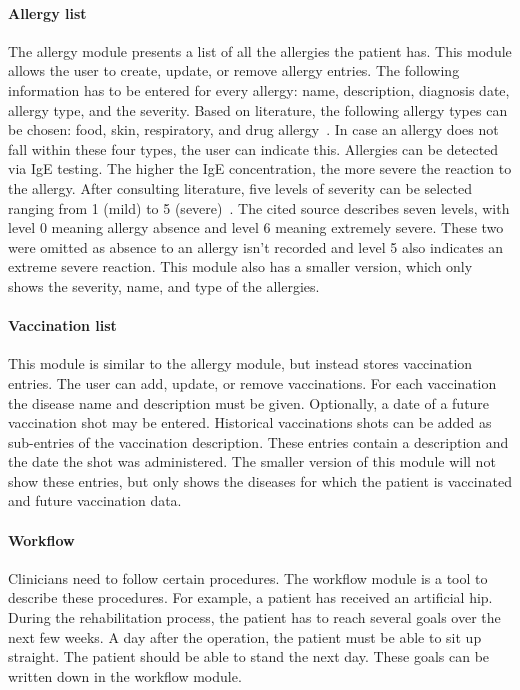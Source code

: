         \paragraph{Allergy list} The allergy module presents a list of all the allergies the patient has. This module allows the user to create, update, or remove allergy entries. The following information has to be entered for every allergy: name, description, diagnosis date, allergy type, and the severity. Based on literature, the following allergy types can be chosen: food, skin, respiratory, and drug allergy~\cite{AllergyTypesACAAI, AllergyTypesHealth24}. In case an allergy does not fall within these four types, the user can indicate this. Allergies can be detected via IgE testing. The higher the IgE concentration, the more severe the reaction to the allergy. After consulting literature, five levels of severity can be selected ranging from 1 (mild) to 5 (severe)~\cite{AllergySeverity}. The cited source describes seven levels, with level 0 meaning allergy absence and level 6 meaning extremely severe. These two were omitted as absence to an allergy isn't recorded and level 5 also indicates an extreme severe reaction. This module also has a smaller version, which only shows the severity, name, and type of the allergies.

        \paragraph{Vaccination list} This module is similar to the allergy module, but instead stores vaccination entries. The user can add, update, or remove vaccinations. For each vaccination the disease name and description must be given. Optionally, a date of a future vaccination shot may be entered. Historical vaccinations shots can be added as sub-entries of the vaccination description. These entries contain a description and the date the shot was administered. The smaller version of this module will not show these entries, but only shows the diseases for which the patient is vaccinated and future vaccination data.

        \paragraph{Workflow} Clinicians need to follow certain procedures. The workflow module is a tool to describe these procedures. For example, a patient has received an artificial hip. During the rehabilitation process, the patient has to reach several goals over the next few weeks. A day after the operation, the patient must be able to sit up straight. The patient should be able to stand the next day. These goals can be written down in the workflow module.

